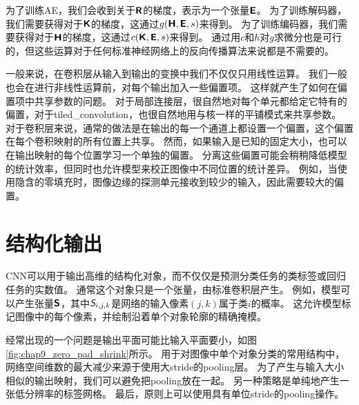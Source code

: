 为了训练\gls{AE}，我们会收到关于$\textsf{\textbf{R}}$的梯度，表示为一个张量$\textsf{\textbf{E}}$。
为了训练解码器，我们需要获得对于$\textsf{\textbf{K}}$的梯度，这通过$g(\textsf{\textbf{H}}, \textsf{\textbf{E}}, s)$来得到。
为了训练编码器，我们需要获得对于$\textsf{\textbf{H}}$的梯度，这通过$c(\textsf{\textbf{K}}, \textsf{\textbf{E}}, s)$来得到。
通过用$c$和$h$对$g$求微分也是可行的，但这些运算对于任何标准神经网络上的反向传播算法来说都是不需要的。
 
 
一般来说，在卷积层从输入到输出的变换中我们不仅仅只用线性运算。
我们一般也会在进行非线性运算前，对每个输出加入一些偏置项。
这样就产生了如何在偏置项中共享参数的问题。
对于局部连接层，很自然地对每个单元都给定它特有的偏置，对于\gls{tiled_convolution}，也很自然地用与核一样的平铺模式来共享参数。
对于卷积层来说，通常的做法是在输出的每一个通道上都设置一个偏置，这个偏置在每个卷积映射的所有位置上共享。
然而，如果输入是已知的固定大小，也可以在输出映射的每个位置学习一个单独的偏置。
分离这些偏置可能会稍稍降低模型的统计效率，但同时也允许模型来校正图像中不同位置的统计差异。
例如，当使用隐含的零填充时，图像边缘的探测单元接收到较少的输入，因此需要较大的偏置。

\section{结构化输出}
\label{sec:structured_outputs}

\gls{CNN}可以用于输出高维的结构化对象，而不仅仅是预测分类任务的类标签或回归任务的实数值。
通常这个对象只是一个张量，由标准卷积层产生。
例如，模型可以产生张量$\textsf{\textbf{S}}$，其中$\textit{\textsf{S}}_{i,j,k}$是网络的输入像素$(j, k)$属于类$i$的概率。
这允许模型标记图像中的每个像素，并绘制沿着单个对象轮廓的精确掩模。

经常出现的一个问题是输出平面可能比输入平面要小，如图\ref{fig:chap9_zero_pad_shrink}所示。
用于对图像中单个对象分类的常用结构中，网络空间维数的最大减少来源于使用大\gls{stride}的\gls{pooling}层。
为了产生与输入大小相似的输出映射，我们可以避免把\gls{pooling}放在一起\citep{jain2007supervised}。
另一种策略是单纯地产生一张低分辨率的标签网格\citep{Pinheiro+Collobert-ICML2014,Pinheiro+Collobert-CVPR2015}。
最后，原则上可以使用具有单位\gls{stride}的\gls{pooling}操作。

